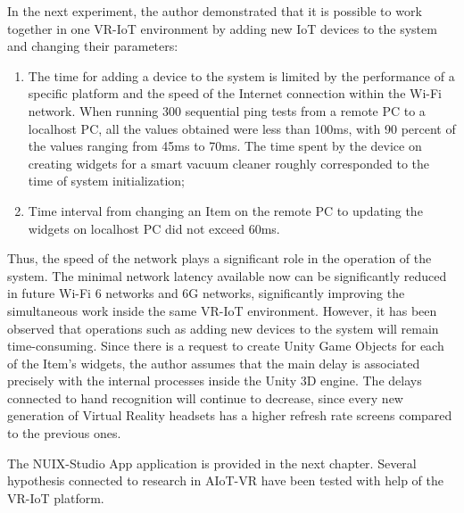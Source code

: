 In the next experiment, the author demonstrated that it is possible to work together in one VR-IoT environment by adding new IoT devices to the system and changing their parameters:
\begin{enumerate}
    \item The time for adding a device to the system is limited by the performance of a specific platform and the speed of the Internet connection within the Wi-Fi network. When running 300 sequential ping tests from a remote PC to a localhost PC, all the values ​​obtained were less than 100ms, with 90 percent of the values ranging from 45ms to 70ms. The time spent by the device on creating widgets for a smart vacuum cleaner roughly corresponded to the time of system initialization;
    \item Time interval from changing an Item on the remote PC to updating the widgets on localhost PC did not exceed 60ms.
\end{enumerate}

Thus, the speed of the network plays a significant role in the operation of the system. The minimal network latency available now can be significantly reduced in future Wi-Fi 6 networks and 6G networks, significantly improving the simultaneous work inside the same VR-IoT environment. However, it has been observed that operations such as adding new devices to the system will remain time-consuming. Since there is a request to create Unity Game Objects for each of the Item's widgets, the author assumes that the main delay is associated precisely with the internal processes inside the Unity 3D engine. The delays connected to hand recognition will continue to decrease, since every new generation of Virtual Reality headsets has a higher refresh rate screens compared to the previous ones. 

The NUIX-Studio App application is provided in the next chapter. Several hypothesis connected to research in AIoT-VR have been tested with help of the VR-IoT platform. 